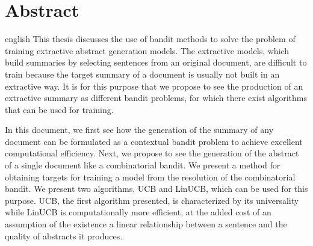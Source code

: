 \chapter*{Abstract}             %
\label{chap:abstract}           %

\begin{otherlanguage*}{english}
  This thesis discusses the use of bandit methods to solve 
the problem of training extractive abstract generation models.
The extractive models, which build summaries by selecting sentences from an 
original document, are difficult to train because the target summary of a document is usually not built in an extractive way.
It is for this purpose that we propose to see the production of an extractive summary
as different bandit problems, for which there exist algorithms that can be used for training.

In this document, we first see how the generation of the summary 
of any document can be formulated as a contextual bandit problem
to achieve excellent computational efficiency.
Next, we propose to see the generation of the abstract 
of a single document like a combinatorial bandit.
We present a method for obtaining targets 
for training a model from the resolution 
of the combinatorial bandit.
We present two algorithms, UCB and LinUCB, which can 
be used for this purpose.
UCB, the first algorithm presented, is characterized by 
its universality while LinUCB is computationally
more efficient, at the added cost of an assumption of the existence 
a linear relationship between a sentence and the quality of abstracts 
it produces. 
\end{otherlanguage*}
